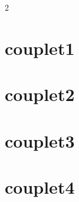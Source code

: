 



\newpage



\begin{multicols}{2}
	\songlyrics
\end{multicols}


\newpage

\section*{couplet1}

\section*{couplet2}

\section*{couplet3}


\section*{couplet4}


